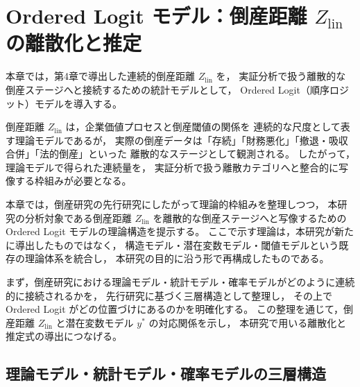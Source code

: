 
\chapter{Ordered Logit モデル：倒産距離 $Z_{\text{lin}}$ の離散化と推定}
\label{chap:ordered_logit}

\graphicspath{{figures/}}

本章では，第4章で導出した連続的倒産距離 $Z_{\text{lin}}$ を，
実証分析で扱う離散的な倒産ステージへと接続するための統計モデルとして，
Ordered Logit（順序ロジット）モデルを導入する。

倒産距離 $Z_{\text{lin}}$ は，企業価値プロセスと倒産閾値の関係を
連続的な尺度として表す理論モデルであるが，
実際の倒産データは「存続」「財務悪化」「撤退・吸収合併」「法的倒産」といった
離散的なステージとして観測される。
したがって，理論モデルで得られた連続量を，
実証分析で扱う離散カテゴリへと整合的に写像する枠組みが必要となる。

本章では，倒産研究の先行研究にしたがって理論的枠組みを整理しつつ，
本研究の分析対象である倒産距離 $Z_{\text{lin}}$ を離散的な倒産ステージへと写像するための
Ordered Logit モデルの理論構造を提示する。
ここで示す理論は，本研究が新たに導出したものではなく，
構造モデル・潜在変数モデル・閾値モデルという既存の理論体系を統合し，
本研究の目的に沿う形で再構成したものである。

まず，倒産研究における理論モデル・統計モデル・確率モデルがどのように連続的に接続されるかを，
先行研究に基づく三層構造として整理し，
その上で Ordered Logit がどの位置づけにあるのかを明確化する。
この整理を通じて，倒産距離 $Z_{\text{lin}}$ と潜在変数モデル $y^*$ の対応関係を示し，
本研究で用いる離散化と推定式の導出につなげる。



\section{理論モデル・統計モデル・確率モデルの三層構造}
\label{sec:three_layer_structure}

